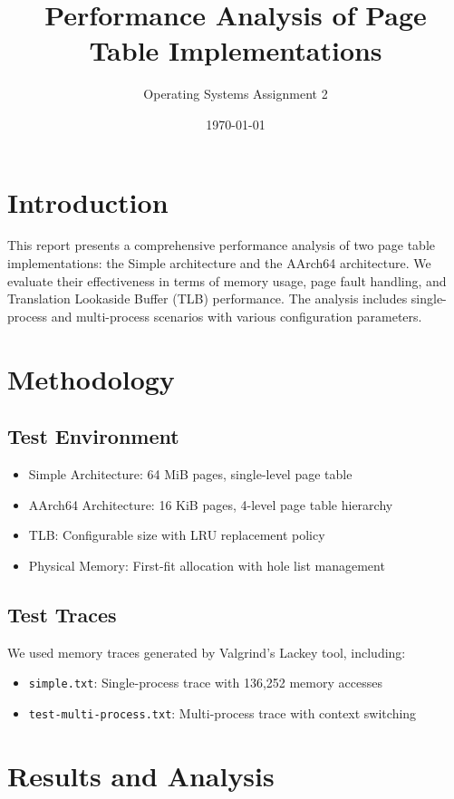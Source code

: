 \documentclass[12pt,a4paper]{article}
\title{Performance Analysis of Page Table Implementations}
\author{Operating Systems Assignment 2}
\date{\today}
\begin{document}
\maketitle

\section{Introduction}

This report presents a comprehensive performance analysis of two page table implementations: the Simple architecture and the AArch64 architecture. We evaluate their effectiveness in terms of memory usage, page fault handling, and Translation Lookaside Buffer (TLB) performance. The analysis includes single-process and multi-process scenarios with various configuration parameters.

\section{Methodology}

\subsection{Test Environment}
\begin{itemize}
    \item Simple Architecture: 64 MiB pages, single-level page table
    \item AArch64 Architecture: 16 KiB pages, 4-level page table hierarchy
    \item TLB: Configurable size with LRU replacement policy
    \item Physical Memory: First-fit allocation with hole list management
\end{itemize}

\subsection{Test Traces}
We used memory traces generated by Valgrind's Lackey tool, including:
\begin{itemize}
    \item \texttt{simple.txt}: Single-process trace with 136,252 memory accesses
    \item \texttt{test-multi-process.txt}: Multi-process trace with context switching
\end{itemize}

\section{Results and Analysis}
\end{document}
